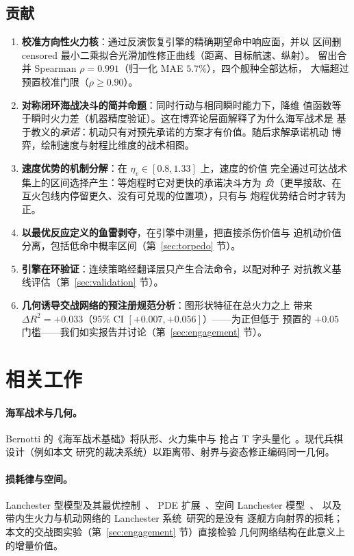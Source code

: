 \documentclass[12pt,a4paper]{ctexart}
\newcommand{\etav}{\eta_v}
\begin{document}
\subsection{贡献}
\begin{enumerate}
\item \textbf{校准方向性火力核}：通过反演恢复引擎的精确期望命中响应面，并以
区间删 censored 最小二乘拟合光滑加性修正曲线（距离、目标航速、纵射）。
留出合并 Spearman $\rho = 0.991$（归一化 MAE $5.7\%$），四个舰种全部达标，
大幅超过预置校准门限（$\rho\ge0.90$）。
\item \textbf{对称闭环海战决斗的简并命题}：同时行动与相同瞬时能力下，降维
值函数等于瞬时火力差（机器精度验证）。这在博弈论层面解释了为什么海军战术是
基于教义的\emph{承诺}：机动只有对预先承诺的方案才有价值。随后求解承诺机动
博弈，绘制速度与射程比维度的战术相图。
\item \textbf{速度优势的机制分解}：在 $\etav\in[0.8,1.33]$ 上，速度的价值
完全通过可达战术集上的区间选择产生：等炮程时它对更快的承诺决斗方为
\emph{负}（更早接敌、在互火包线内停留更久、没有可兑现的位置项），只有与
炮程优势结合时才转为正。
\item \textbf{以最优反应定义的鱼雷剥夺}，在引擎中测量，把直接杀伤价值与
迫机动价值分离，包括低命中概率区间（第~\ref{sec:torpedo} 节）。
\item \textbf{引擎在环验证}：连续策略经翻译层只产生合法命令，以配对种子
对抗教义基线评估（第~\ref{sec:validation} 节）。
\item \textbf{几何诱导交战网络的预注册规范分析}：图形状特征在总火力之上
带来 $\Delta R^2 = +0.033$（$95\%$ CI $[+0.007,+0.056]$）——为正但低于
预置的 $+0.05$ 门槛——我们如实报告并讨论（第~\ref{sec:engagement} 节）。
\end{enumerate}

\section{相关工作}\label{sec:related}

\paragraph{海军战术与几何。} Bernotti 的《海军战术基础》将队形、火力集中与
抢占 T 字头量化~\cite{bernotti1911,bernotti1912}。现代兵棋设计（例如本文
研究的裁决系统）以距离带、射界与姿态修正编码同一几何。

\paragraph{损耗律与空间。} Lanchester 型模型及其最优控制~\cite{taylor1974}、
PDE 扩展~\cite{protopopescu1989}、空间 Lanchester 模型~\cite{gonzalez2011}、
以及带内生火力与机动网络的 Lanchester 系统~\cite{networked2020}研究的是没有
逐舰方向射界的损耗；本文的交战图实验（第~\ref{sec:engagement} 节）直接检验
几何网络结构在此意义上的增量价值。
\end{document}
